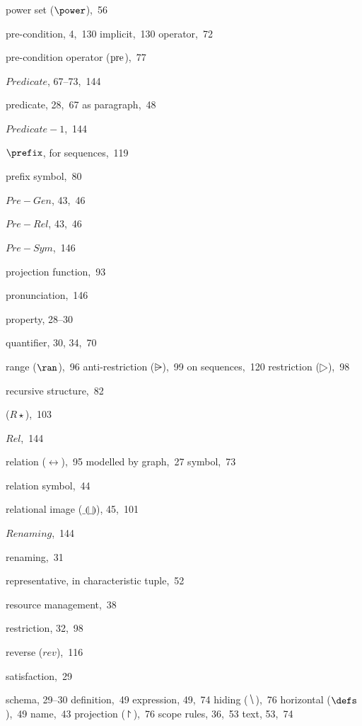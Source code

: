 \begin{theindex}
\item power set ($\power$),~56
\item pre-condition, 4,~130
  \subitem implicit,~130
  \subitem operator,~72
\item pre-condition operator ($\rm pre$),~77
\item \(Predicate\), 67--73,~144
\item predicate, 28,~67
  \subitem as paragraph,~48
\item \(Predicate-1\),~144
\item $\prefix$, for sequences,~119
\item prefix symbol,~80
\item \(Pre-Gen\), 43,~46
\item \(Pre-Rel\), 43,~46
\item \(Pre-Sym\),~146
\item projection function,~93
\item pronunciation,~146
\item property, 28--30
\indexspace %
\item quantifier, 30, 34,~70
\indexspace %
\item range ($\ran$),~96
  \subitem anti-restriction ($\nrres$),~99
  \subitem on sequences,~120
  \subitem restriction ($\rres$),~98
\item recursive structure,~82
\item {} ($R \star$),~103
\item \(Rel\),~144
\item relation ($\rel$),~95
  \subitem modelled by graph,~27
  \subitem symbol,~73
\item relation symbol,~44
\item relational image ($\_\limg\_\rimg$), 45,~101
\item \(Renaming\),~144
\item renaming,~31
\item representative, in characteristic tuple,~52
\item resource management,~38
\item restriction, 32,~98
\item reverse ($rev$),~116
\indexspace %
\item satisfaction,~29
\item schema, 29--30
  \subitem definition,~49
  \subitem expression, 49,~74
  \subitem hiding ($\hide$),~76
  \subitem horizontal ($\defs$),~49
  \subitem name,~43
  \subitem projection ($\project$),~76
  \subitem scope rules, 36,~53
  \subitem text, 53,~74

\end{theindex}
